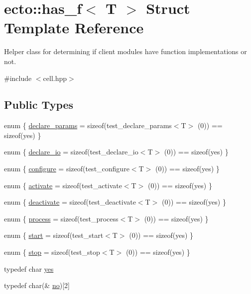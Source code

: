 \hypertarget{structecto_1_1has__f}{}\section{ecto\+:\+:has\+\_\+f$<$ T $>$ Struct Template Reference}
\label{structecto_1_1has__f}


Helper class for determining if client modules have function implementations or not.  




{\ttfamily \#include $<$cell.\+hpp$>$}

\subsection*{Public Types}
\begin{DoxyCompactItemize}
\item 
enum \{ \hyperlink{structecto_1_1has__f_a37dd9c69c6cfed2ac70c2529d493d410a41824f56b5af096de7e6ee2ccbe9943b}{declare\+\_\+params} = sizeof(test\+\_\+declare\+\_\+params$<$T$>$ (0)) == sizeof(yes)
 \}
\item 
enum \{ \hyperlink{structecto_1_1has__f_abc0a1a04163d85af95636c6213729909ac01ab4ed00f005d55b0813ccb49166f2}{declare\+\_\+io} = sizeof(test\+\_\+declare\+\_\+io$<$T$>$ (0)) == sizeof(yes)
 \}
\item 
enum \{ \hyperlink{structecto_1_1has__f_a173737354c871f8785a6bbe7640bda1da1bc6475abb988c1b998c700d66894960}{configure} = sizeof(test\+\_\+configure$<$T$>$ (0)) == sizeof(yes)
 \}
\item 
enum \{ \hyperlink{structecto_1_1has__f_a8f077b20e8dd579e1a427ac6c80c3d3fa848797161f1dda4f3676f4e2271ebe40}{activate} = sizeof(test\+\_\+activate$<$T$>$ (0)) == sizeof(yes)
 \}
\item 
enum \{ \hyperlink{structecto_1_1has__f_afa9dc8feb074d51ee4600f20447b2724a0f0eba1c7cf0a59268313a95842a7b42}{deactivate} = sizeof(test\+\_\+deactivate$<$T$>$ (0)) == sizeof(yes)
 \}
\item 
enum \{ \hyperlink{structecto_1_1has__f_a575b2f80b107061801e4c2ebd36bd2fcaa6d57b41a7edff0b538fbfddd6e1bf0e}{process} = sizeof(test\+\_\+process$<$T$>$ (0)) == sizeof(yes)
 \}
\item 
enum \{ \hyperlink{structecto_1_1has__f_a2f5a531214c34e93b8efd059afed9348a210df924551c3e6407abe7c1f12b85d0}{start} = sizeof(test\+\_\+start$<$T$>$ (0)) == sizeof(yes)
 \}
\item 
enum \{ \hyperlink{structecto_1_1has__f_af1ab6e8ed499c6c3b404cd7aeda85c87a6db3f78bcdda21cf158666ed1f9dfead}{stop} = sizeof(test\+\_\+stop$<$T$>$ (0)) == sizeof(yes)
 \}
\item 
typedef char \hyperlink{structecto_1_1has__f_a3fb902f1eed02919195aff1a6b28eb76}{yes}
\item 
typedef char(\& \hyperlink{structecto_1_1has__f_ae0c6da775cf20caed616e24681af2807}{no})\mbox{[}2\mbox{]}
\end{DoxyCompactItemize}
